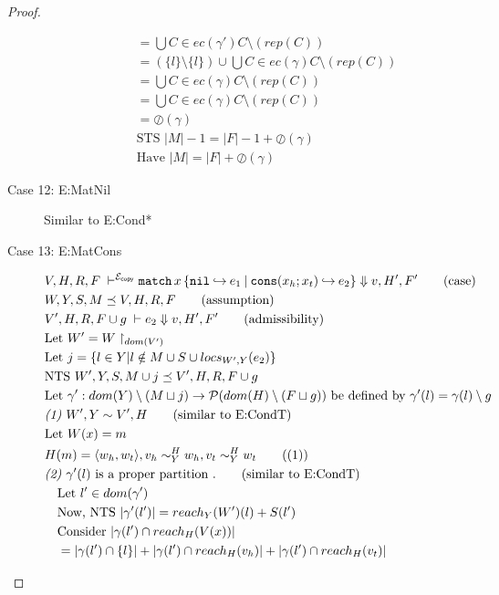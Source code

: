 \documentclass{easychair}
\newcommand{\ms}[1]{\ensuremath{\mathsf{#1}}}
\newcommand{\veq}[4]{#3 \sim^{#1}_{#2} #4}
\newcommand{\oh}[1]{\oslash(#1)}
\newcommand{\copySem}{\ensuremath{\mathcal{E}_{\ms{copy}}}}
\theoremstyle{definition}
\begin{document}
\begin{proof}
\begin{description}
\begin{align*}
		&\quad = \bigcup C \in ec(\gamma') C \setminus (rep(C))\\
		&\quad = (\{l\} \setminus \{l\}) \cup \bigcup C \in ec(\gamma) C \setminus (rep(C))\\
		&\quad = \bigcup C \in ec(\gamma) C \setminus (rep(C))\\
		&\quad = \bigcup C \in ec(\gamma) C \setminus (rep(C))\\
		&\quad = \oh{\gamma}\\
		&\quad \text{STS } |M| - 1 = |F| - 1 + \oh{\gamma}\\
		&\quad \text{Have } |M| = |F| + \oh{\gamma} \tag{condition 5. of $\preceq$}
	\end{align*}
  \item[Case 12: E:MatNil]
  Similar to E:Cond*
  \item[Case 13: E:MatCons]
  \begin{align*}
		&V,H,R,F \; \vdash^{\copySem} \listcaseexcst{x}{e_1}{x_h}{x_t}{e_2} \Downarrow v,H',F' \tag{case}\\
		&W,Y,S,M \preceq V,H,R,F \tag{assumption}\\
		&V',H,R,F \cup g \; \vdash e_2 \Downarrow v, H',F' \tag{admissibility}\\
		&\text{Let } W' = W \restriction_{dom(V')}\\
		&\text{Let } j = \{l \in Y | l \notin M \cup S \cup locs_{W',Y}(e_2) \}\\
		&\text{NTS } W',Y,S,M \cup j \preceq V',H,R,F \cup g\\
		&\text{Let } \gamma' : dom(Y) \setminus (M \sqcup j) 
		\to \mathcal{P}(dom(H) \setminus (F \sqcup g)) \text{ be defined by } 
		\gamma'(l) = \gamma(l) \setminus g\\
		&\emph{(1) } W',Y \sim V',H \tag{similar to E:CondT}\\
		&\text{Let } W(x) = m\\
		&H(m) = \pairexcst{w_h}{w_t}, \veq{H}{Y}{v_h}{w_h},\veq{H}{Y}{v_t}{w_t} \tag{(1)} \\
		&\emph{(2) } \gamma'(l) \text{ is a proper partition }. \tag{similar to E:CondT}\\
		&\quad \text{Let } l' \in dom(\gamma')\\
		&\quad \text{Now, NTS } |\gamma'(l')| = reach_{Y}(W')(l) + S(l')\\
		&\quad \text{Consider } |\gamma(l') \cap reach_H(V(x))|\\
		&\quad = |\gamma(l') \cap \{l\}| + |\gamma(l') \cap reach_H(v_h)| 
			+ |\gamma(l') \cap reach_H(v_t)|\\ 

\end{align*}
\end{description}
\end{proof}
\end{document}
